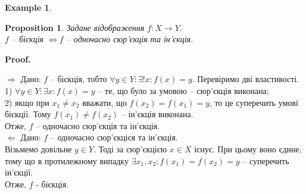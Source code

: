 \documentclass[a4paper, 14pt]{extarticle}
\makeatletter
\def\rightproof{$\boxed{\Rightarrow}$ }
\def\leftproof{$\boxed{\Leftarrow}$ }
\theoremstyle{theoremdd}
\theoremstyle{theoremdd}
\theoremstyle{theoremdd}
\theoremstyle{theoremdd}
\theoremstyle{theoremdd}
\newtheorem{example}[theorem]{Example}
\theoremstyle{theoremdd}
\theoremstyle{theoremdd}
\theoremstyle{theoremdd}
\theoremstyle{theoremdd}
\newtheorem{proposition}[theorem]{Proposition}
\theoremstyle{theoremdd}
\theoremstyle{theoremdd}
\theoremstyle{theoremdd}
\theoremstyle{theoremdd}
\theoremstyle{theoremdd}
\theoremstyle{theoremdd}
\renewenvironment{proof}[1][Proof.\\]{\par
\pushQED{\hfill \qed}%
\normalfont \topsep6\p@\@plus6\p@\relax
\trivlist
\item\relax
{\bfseries
#1\@addpunct{.}}\hspace\labelsep\ignorespaces
}{%
\popQED\endtrivlist\@endpefalse
}
\makeatother
\begin{document}
\begin{example}
\begin{figure}[H]
{\qquad
{}
}
\end{figure}
\end{example}
	
	\begin{proposition}
	Задане відображення $f \colon X \to Y$. \\
	$f$ -- бієкція $\iff f$ -- одночасно сюр'єкція та ін'єкція.
	\end{proposition}
	
	\begin{proof}
	\rightproof Дано: $f$ -- бієкція, тобто $\forall y \in Y: \exists! x: f(x) = y$. Перевіримо дві властивості.\\
	1) $\forall y \in Y: \exists x: f(x) = y$ -- те, що було за умовою -- сюр'єкція виконана;\\
	2) якщо при $x_1 \neq x_2$ вважати, що $f(x_2) = f(x_1) = y$, то це суперечить умові бієкції. Тому $f(x_1) \neq f(x_2)$ -- ін'єкція виконана.\\
	Отже, $f$ -- одночасно сюр'єкція та ін'єкція.
	\bigskip \\
	\leftproof Дано: $f$ -- одночасно сюр'єкцієя та ін'єкція.\\
	Візьмемо довільне $y \in Y$. Тоді за сюр'єкцією $x \in X$ існує. При цьому воно єдине, тому що в протилежному випадку $\exists x_1, x_2: f(x_1) = f(x_2) = y$ -- суперечить ін'єкції.\\ 
	Отже, $f$ - бієкція.
	\end{proof}
	
\end{document}

